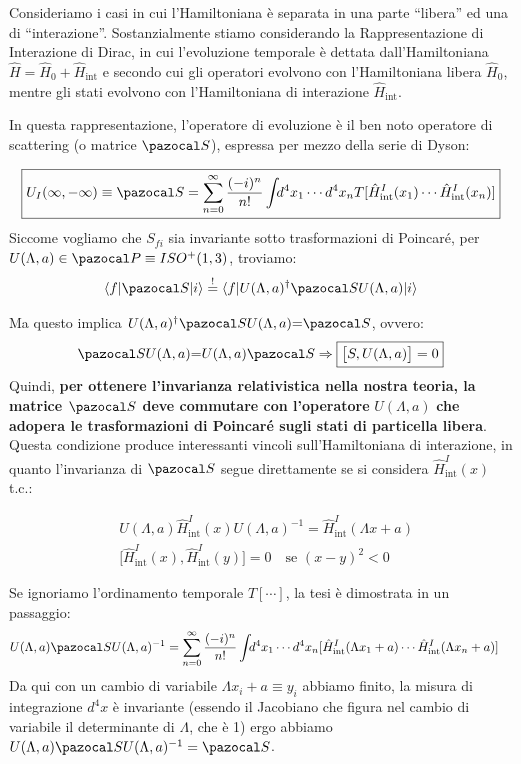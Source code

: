 \documentclass[../main.tex]{subfiles}
\begin{document}
Consideriamo i casi in cui l'Hamiltoniana è separata in una parte “libera” ed una di “interazione”. Sostanzialmente stiamo considerando la Rappresentazione di Interazione di Dirac, in cui l'evoluzione temporale è dettata dall'Hamiltoniana \(\hat{H} = \hat{H}_0+\hat{H}_\text{int}\) e secondo cui gli operatori evolvono con l'Hamiltoniana libera $\hat{H}_0$, mentre gli stati evolvono con l'Hamiltoniana di interazione $\hat{H}_\text{int}$.

In questa rappresentazione, l'operatore di evoluzione è il ben noto operatore di scattering (o matrice $\pazocal S$), espressa per mezzo della serie di Dyson:

\[
\boxed{U_I(\infty, -\infty) \equiv \pazocal S = \sum_{n=0}^\infty \frac{(-i)^n}{n!}\int_{}d^4x_1\cdots d^4x_n T[\hat{H}^I_\text{int}(x_1)\cdots \hat{H}^I_\text{int}(x_n)]}
\]
Siccome vogliamo che $S_{fi}$ sia invariante sotto trasformazioni di Poincaré, per \(U(\Lambda, a)\in\pazocal P \equiv ISO^+(1,3)\), troviamo:
\[
\langle f| \pazocal S |i\rangle \overset{!}{=} \langle f| U(\Lambda, a)^\dagger\pazocal S U(\Lambda, a) |i \rangle
\]

Ma questo implica \(U(\Lambda, a)^\dagger\pazocal S U(\Lambda, a) {=} \pazocal S\), ovvero:
\[
\pazocal S U(\Lambda, a) {=} U(\Lambda, a)\pazocal S \Rightarrow \boxed{\big[S, U(\Lambda,a)\big] = 0}
\]
Quindi, \textbf{per ottenere l'invarianza relativistica nella nostra teoria, la matrice $\pazocal S$ deve commutare con l'operatore} $U(\Lambda,a)$ \textbf{che adopera le trasformazioni di Poincaré sugli stati di particella libera}. Questa condizione produce interessanti vincoli sull'Hamiltoniana di interazione, in quanto l'invarianza di $\pazocal S$ segue direttamente se si considera $\hat{H}^I_\text{int}(x)$ t.c.:

\begin{equation}
    \boxed{
    \begin{aligned}
        &U(\Lambda, a) \hat{H}^I_\text{int}(x) U(\Lambda, a)^{-1} = \hat{H}^I_\text{int}(\Lambda x + a)\\
        &\big[\hat{H}^I_\text{int}(x),\hat{H}^I_\text{int}(y)\big] = 0\quad \text{se } (x-y)^2<0 
    \end{aligned}}
    \label{eq:hamilt_requirements}
\end{equation}

Se ignoriamo l'ordinamento temporale $T[\cdots]$, la tesi è dimostrata in un passaggio:
\begin{align*}
    U(\Lambda, a) \pazocal S U(\Lambda, a)^{-1} &= \sum_{n=0}^\infty \frac{(-i)^n}{n!}\int_{}d^4x_1\cdots d^4x_n [\hat{H}^I_\text{int}(\Lambda x_1 + a)\cdots \hat{H}^I_\text{int}(\Lambda x_n + a)]
\end{align*}
Da qui con un cambio di variabile $\Lambda x_i + a \equiv y_i$ abbiamo finito, la misura di integrazione $d^4x$ è invariante (essendo il Jacobiano che figura nel cambio di variabile il determinante di $\Lambda$, che è 1) ergo abbiamo \(U(\Lambda, a) \pazocal S U(\Lambda, a)^{-1} = \pazocal S\).
\end{document}

